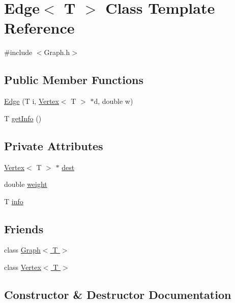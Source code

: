 \hypertarget{classEdge}{}\section{Edge$<$ T $>$ Class Template Reference}
\label{classEdge}


{\ttfamily \#include $<$Graph.\+h$>$}

\subsection*{Public Member Functions}
\begin{DoxyCompactItemize}
\item 
\hyperlink{classEdge_a96686534f9eefc8cce07582f7f38369b}{Edge} (T i, \hyperlink{classVertex}{Vertex}$<$ T $>$ $\ast$d, double w)
\item 
T \hyperlink{classEdge_a9cfd65d4ac2da66e35350e6ad7ab531e}{get\+Info} ()
\end{DoxyCompactItemize}
\subsection*{Private Attributes}
\begin{DoxyCompactItemize}
\item 
\hyperlink{classVertex}{Vertex}$<$ T $>$ $\ast$ \hyperlink{classEdge_ae4d65678b91bd9d814af4720ad87cd0c}{dest}
\item 
double \hyperlink{classEdge_af188b57b604f0d65e2da48733bd76426}{weight}
\item 
T \hyperlink{classEdge_a3c76337d535f346456b825b3cbc88b14}{info}
\end{DoxyCompactItemize}
\subsection*{Friends}
\begin{DoxyCompactItemize}
\item 
class \hyperlink{classEdge_aefa9b76cd57411c5354e5620dc2d84dd}{Graph$<$ T $>$}
\item 
class \hyperlink{classEdge_a2e120a12dec663fa334633b4f26cbed8}{Vertex$<$ T $>$}
\end{DoxyCompactItemize}


\subsection{Constructor \& Destructor Documentation}
